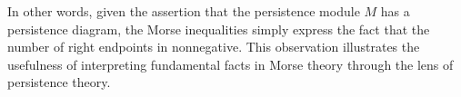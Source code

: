 In other words, given the assertion that the persistence module $M$ has a persistence diagram, the Morse inequalities simply express the fact that the number of right endpoints in nonnegative.
This observation illustrates the usefulness of interpreting fundamental facts in Morse theory through the lens of persistence theory.


